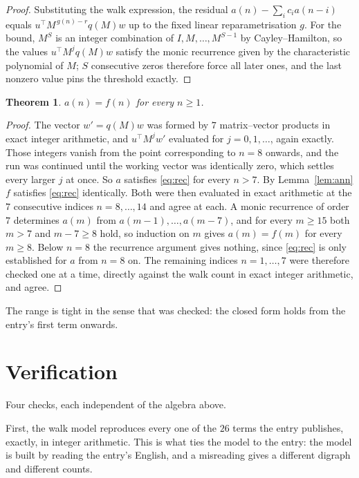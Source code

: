 \documentclass[11pt,a4paper]{article}
\theoremstyle{plain}
\newtheorem{theorem}{Theorem}
\theoremstyle{definition}
\begin{document}
\begin{proof}
Substituting the walk expression, the residual $a(n)-\sum_ic_ia(n-i)$ equals
$u^{\!\top}M^{\,g(n)-r}q(M)w$ up to the fixed linear reparametrisation $g$. For the bound,
$M^{S}$ is an integer combination of $I,M,\dots,M^{S-1}$ by Cayley--Hamilton, so the values
$u^{\!\top}M^{j}q(M)w$ satisfy the monic recurrence given by the characteristic polynomial of
$M$; $S$ consecutive zeros therefore force all later ones, and the last nonzero value pins the
threshold exactly.
\end{proof}

\begin{theorem}
$a(n)=f(n)$ for every $n\ge1$.
\end{theorem}

\begin{proof}
The vector $w'=q(M)w$ was formed by $7$ matrix--vector products in exact integer
arithmetic, and $u^{\!\top}M^{j}w'$ evaluated for $j=0,1,\dots$, again exactly. Those integers
vanish from the point corresponding to $n=8$ onwards, and the run was continued until the
working vector was identically zero, which settles every larger $j$ at once. So $a$ satisfies
\eqref{eq:rec} for every $n>7$. By Lemma~\ref{lem:ann} $f$ satisfies \eqref{eq:rec}
identically. Both were then evaluated in exact arithmetic at the $7$ consecutive indices
$n=8,\dots,14$ and agree at each. A monic recurrence of order $7$
determines $a(m)$ from $a(m-1),\dots,a(m-7)$, and for every $m\ge15$ both
$m>7$ and $m-7\ge8$ hold, so induction on $m$ gives $a(m)=f(m)$ for every
$m\ge8$.
Below $n=8$ the recurrence argument gives nothing, since \eqref{eq:rec} is only
established for $a$ from $n=8$ on. The remaining indices $n=1,\dots,7$ were
therefore checked one at a time, directly against the walk count in exact integer arithmetic,
and agree.
\end{proof}

The range is tight in the sense that was checked: the closed form holds from the entry's first term onwards.

\section{Verification}

Four checks, each independent of the algebra above.

First, the walk model reproduces every one of the $26$ terms the entry publishes,
exactly, in integer arithmetic. This is what ties the model to the entry: the model is built
by reading the entry's English, and a misreading gives a different digraph and different
counts.
\end{document}

